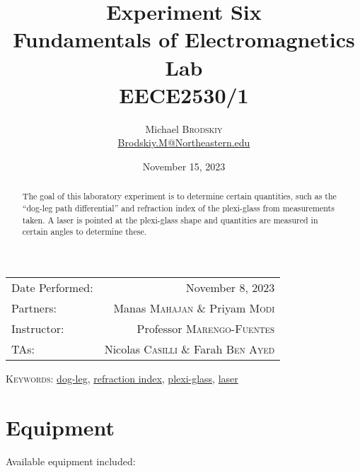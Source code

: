 \documentclass[
	letterpaper, %
	10pt, %
]{CSUniSchoolLabReport}
\title{Experiment Six\\ Fundamentals of Electromagnetics Lab \\ EECE2530/1} %
\author{Michael \textsc{Brodskiy}\\ \small \href{mailto:Brodskiy.M@Northeastern.edu}{Brodskiy.M@Northeastern.edu}}
\date{November 15, 2023} %
\begin{document}
\maketitle %

\begin{center}
	\begin{tabular}{l r}
		Date Performed: & November 8, 2023 \\ %
        Partners: & Manas \textsc{Mahajan} \& Priyam \textsc{Modi} \\ %
		Instructor: & Professor \textsc{Marengo-Fuentes} \\ %
        TAs: & Nicolas \textsc{Casilli} \& Farah \textsc{Ben Ayed} \\ %
	\end{tabular}
\end{center}

\newpage

\begin{abstract}

  The goal of this laboratory experiment is to determine certain quantities, such as the ``dog-leg path differential'' and refraction index of the plexi-glass from measurements taken. A laser is pointed at the plexi-glass shape and quantities are measured in certain angles to determine these.

\end{abstract}

\begin{flushleft}

  \textsc{Keywords:} \underline{dog-leg}, \underline{refraction index}, \underline{plexi-glass}, \underline{laser}

\end{flushleft}

\newpage

\section{Equipment}

\hspace{.5 in} Available equipment included:\\
\end{document}
